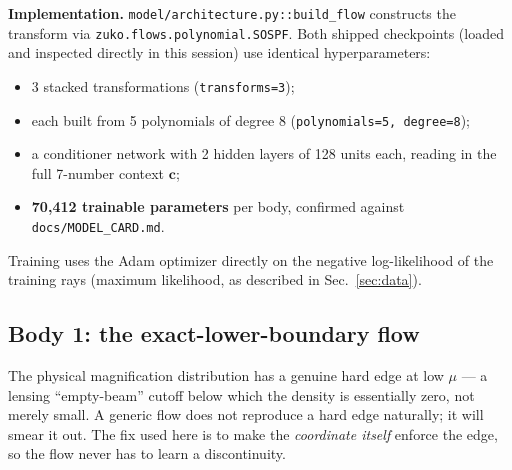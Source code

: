 \documentclass[11pt]{article}
\newcommand{\code}[1]{\texttt{#1}}
\newcommand{\file}[1]{\texttt{#1}}
\newcommand{\vect}[1]{\boldsymbol{#1}}
\begin{document}
\textbf{Implementation.} \file{model/architecture.py::build\_flow}
constructs the transform via \code{zuko.flows.polynomial.SOSPF}. Both
shipped checkpoints (loaded and inspected directly in this session) use
identical hyperparameters:
\begin{itemize}
 \item 3 stacked transformations (\code{transforms=3});
 \item each built from 5 polynomials of degree 8
   (\code{polynomials=5, degree=8});
 \item a conditioner network with 2 hidden layers of 128 units each,
   reading in the full 7-number context $\vect c$;
 \item \textbf{70{,}412 trainable parameters} per body, confirmed against
   \file{docs/MODEL\_CARD.md}.
\end{itemize}
Training uses the Adam optimizer directly on the negative log-likelihood of
the training rays (maximum likelihood, as described in
Sec.~\ref{sec:data}).

\subsection{Body 1: the exact-lower-boundary flow}
\label{sec:boundary}

The physical magnification distribution has a genuine hard edge at low
$\mu$ — a lensing ``empty-beam'' cutoff below which the density is
essentially zero, not merely small. A generic flow does not reproduce a
hard edge naturally; it will smear it out. The fix used here is to make the
\emph{coordinate itself} enforce the edge, so the flow never has to learn a
discontinuity.
\end{document}
